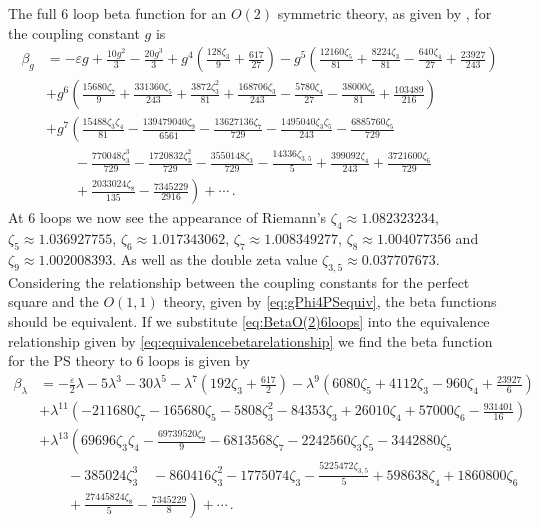 \documentclass[a4paper,11pt]{article}
\begin{document}
The full 6 loop beta function for an $O(2)$ symmetric theory, as given by \cite{Kompaniets:2017yct}, for the coupling constant $g$ is
\begin{align}\label{eq:BetaO(2)6loops}
    \beta_g &= - \varepsilon g +\frac{10 g^2}{3}-\frac{20 g^3}{3}+g^4 \left(\frac{128 \zeta_3}{9}+\frac{617}{27}\right) \nonumber -g^5 \left(\frac{12160
   \zeta_5}{81}+\frac{8224 \zeta_3}{81}-\frac{640 \zeta_4}{27}+\frac{23927}{243}\right) \nonumber \\
   & +g^6
   \left(\frac{15680 \zeta_7}{9}+\frac{331360 \zeta_5}{243}+\frac{3872 \zeta_3^2}{81}+\frac{168706 \zeta_3}{243}-\frac{5780 \zeta_4}{27}-\frac{38000 \zeta_6}{81}+\frac{103489}{216}\right) \nonumber \\
   &+ g^7 \left(\frac{15488 \zeta_3\zeta_4}{81}-\frac{139479040 \zeta_9}{6561}-\frac{13627136 \zeta_7}{729}-\frac{1495040 \zeta_3 \zeta_5}{243}-\frac{6885760 \zeta_5}{729}\nonumber \right.\\
    &\left. \quad  \quad -\frac{770048 \zeta_3^3}{729}  -\frac{1720832 \zeta_3^2}{729}-\frac{3550148 \zeta_3}{729}-\frac{14336 \zeta_{3,5}}{5}+\frac{399092
   \zeta_4}{243}+\frac{3721600 \zeta_6}{729}\nonumber \right.\\
    &\left.   \quad \quad +\frac{2033024 \zeta_8}{135}-\frac{7345229}{2916}\right)  +\cdots\,.
\end{align}
At 6 loops we now see the appearance of Riemann's  $\zeta_4\approx 1.082323234$, $\zeta_5\approx 1.036927755$, $\zeta_6\approx 1.017343062$, $ \zeta_7\approx 1.008349277$, $\zeta_8\approx 1.004077356$ and $\zeta_9\approx 1.002008393$. As well as the double zeta value $\zeta_{3,5}\approx 0.037707673$. Considering the relationship between the coupling constants for the perfect square and the $O(1,1)$ theory, given by \cref{eq:gPhi4PSequiv}, the beta functions should be equivalent. If we substitute \cref{eq:BetaO(2)6loops} into the equivalence relationship given by \cref{eq:equivalencebetarelationship} we find the beta function for the PS theory to 6 loops is given by
\begin{align}\label{eq:sixloopPS}
\beta_\lambda &= -\frac{\varepsilon}{2}  \lambda-5 \lambda ^3 -30 \lambda ^5- \lambda ^7\left(192 \zeta_3+\frac{617}{2}\right) -\lambda ^9
   \left(6080 \zeta_5 + 4112 \zeta_3-960\zeta_4+\frac{23927}{6}\right) \nonumber\\
   & + \lambda ^{11}\left(-211680 \zeta_7-165680 \zeta_5-5808 \zeta_3^2-84353 \zeta_3+26010\zeta_4 +57000 \zeta_6-\frac{931401}{16}\right)   \nonumber\\
& +\lambda ^{13} \left(69696 \zeta_3\zeta_4-\frac{69739520 \zeta_9}{9}-6813568 \zeta_7 -2242560 \zeta_3 \zeta_5 -3442880 \zeta_5 \right. \nonumber \\
&\left.\quad   \quad -385024 \zeta_3^3 \quad -860416 \zeta_3^2-1775074 \zeta_3-\frac{5225472 \zeta_{3,5}}{5}+598638\zeta_4+1860800 \zeta_6 \right. \nonumber \\
&\left. \quad \quad +\frac{27445824 \zeta_8}{5}-\frac{7345229}{8}\right) +\cdots \,.
\end{align}
\end{document}
